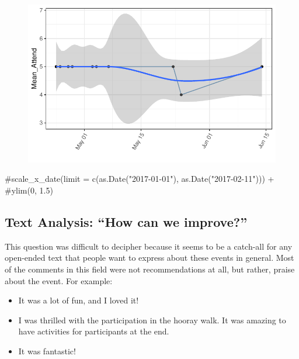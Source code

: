 \documentclass[
  letterpaper,
  DIV=11,
  numbers=noendperiod]{scrartcl}
\newenvironment{Shaded}{\begin{snugshade}}{\end{snugshade}}
\newcommand{\CommentTok}[1]{\textcolor[rgb]{0.37,0.37,0.37}{#1}}
\begin{document}
\begin{figure}[H]

{\centering \includegraphics{ytp_post_event_survey_files/figure-pdf/unnamed-chunk-21-1.pdf}

}

\end{figure}

\begin{Shaded}
\begin{Highlighting}[]
  \CommentTok{\#scale\_x\_date(limit = c(as.Date("2017{-}01{-}01"), as.Date("2017{-}02{-}11"))) +}
  \CommentTok{\#ylim(0, 1.5)}
\end{Highlighting}
\end{Shaded}

\hypertarget{text-analysis-how-can-we-improve}{%
\subsection{Text Analysis: ``How can we
improve?''}\label{text-analysis-how-can-we-improve}}

This question was difficult to decipher because it seems to be a
catch-all for any open-ended text that people want to express about
these events in general. Most of the comments in this field were not
recommendations at all, but rather, praise about the event. For example:

\begin{itemize}
\item
  It was a lot of fun, and I loved it!
\item
  I was thrilled with the participation in the hooray walk. It was
  amazing to have activities for participants at the end.
\item
  It was fantastic!
\end{itemize}
\end{document}
